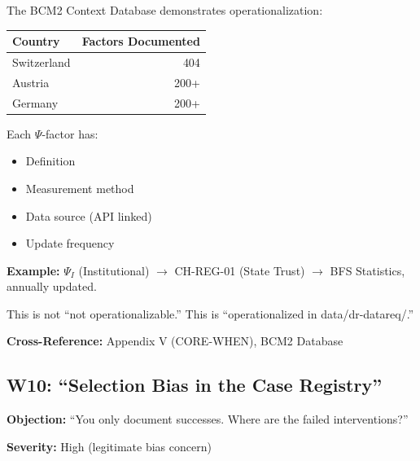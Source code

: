 \begin{axiom}
The BCM2 Context Database demonstrates operationalization:

\begin{center}
\begin{tabular}{lr}
\textbf{Country} & \textbf{Factors Documented} \\
\midrule
Switzerland & 404 \\
Austria & 200+ \\
Germany & 200+ \\
\end{tabular}
\end{center}

Each $\Psi$-factor has:
\begin{itemize}[nosep]
    \item Definition
    \item Measurement method
    \item Data source (API linked)
    \item Update frequency
\end{itemize}

\textbf{Example:} $\Psi_I$ (Institutional) $\rightarrow$ CH-REG-01 (State Trust)
$\rightarrow$ BFS Statistics, annually updated.

This is not ``not operationalizable.'' This is ``operationalized in data/dr-datareq/.''
\end{axiom}

\textbf{Cross-Reference:} Appendix V (CORE-WHEN), BCM2 Database

\subsection{W10: ``Selection Bias in the Case Registry''}
\label{sec:da-w10}

\begin{tcolorbox}[colback=gray!5!white, colframe=gray!75!black]
\textbf{Objection:} ``You only document successes. Where are the failed interventions?''

\textbf{Severity:} High (legitimate bias concern)
\end{tcolorbox}

